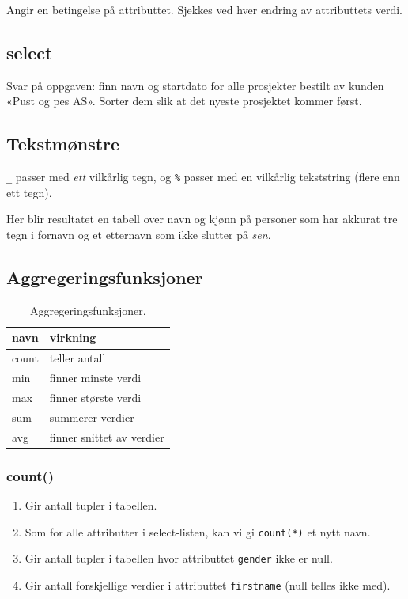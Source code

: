 \documentclass[11pt,a4paper]{article}
\begin{document}

Angir en betingelse på attributtet. Sjekkes ved hver endring av attributtets verdi.

\subsection{select}

Svar på oppgaven: finn navn og startdato for alle prosjekter bestilt av kunden «Pust og pes AS». Sorter dem slik at det nyeste prosjektet kommer først.

\subsection{Tekstmønstre}

\texttt{\_} passer med \textit{ett} vilkårlig tegn, og \texttt{\%} passer med en vilkårlig tekststring (flere enn ett tegn).


Her blir resultatet en tabell over navn og kjønn på personer som har akkurat tre tegn i fornavn og et etternavn som ikke slutter på \textit{sen}.

\subsection{Aggregeringsfunksjoner}
\begin{table}[h!]
\begin{center}
\begin{tabular}{| l | l |}
\hline
\textbf{navn} & \textbf{virkning} \\
\hline
count & teller antall \\
\hline
min & finner minste verdi \\
\hline
max & finner største verdi \\
\hline
sum & summerer verdier \\
\hline
avg & finner snittet av verdier \\
\hline
\end{tabular}
\end{center}
\caption{Aggregeringsfunksjoner.}
\end{table}

\subsubsection{count()}

\begin{enumerate}
\item{Gir antall tupler i tabellen.}
\item{Som for alle attributter i select-listen, kan vi gi \texttt{count(*)} et nytt navn.}
\item{Gir antall tupler i tabellen hvor attributtet \texttt{gender} ikke er null.}
\item{Gir antall forskjellige verdier i attributtet \texttt{firstname} (null telles ikke med).}
\end{enumerate}
\end{document}
